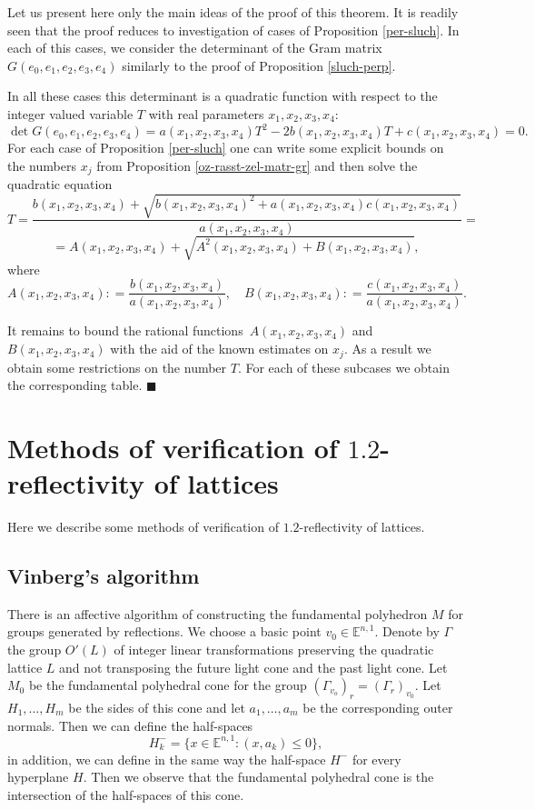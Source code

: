 \documentclass[14pt]{article}
\newenvironment{proof}                    
       {\par\indent{\bf Proof. }} 
	        {\hfill $\scriptstyle\blacksquare$}
\begin{document}
\begin{proof}
Let us present here only the main ideas of the proof  of this theorem.
It is readily seen that the proof reduces to investigation of cases of
Proposition \ref{per-sluch}. In each of this cases, we consider the determinant of the
Gram  matrix $G(e_0, e_1, e_2, e_3, e_4)$ similarly to the proof of
Proposition \ref{sluch-perp}.

In all these cases this determinant is a quadratic function with respect to the
integer valued variable $T$ with real parameters $x_1, x_2, x_3, x_4$:
$$
\det G(e_0, e_1, e_2, e_3, e_4)
= a(x_1, x_2, x_3, x_4) T^2 - 2b(x_1, x_2, x_3, x_4) T +
c(x_1, x_2, x_3, x_4)
= 0.
$$
For each case of Proposition \ref{per-sluch}
one can write some explicit bounds on the numbers
$x_j$ from Proposition \ref{oz-rasst-zel-matr-gr}
and then solve the quadratic equation
$$
T = \dfrac{b(x_1, x_2, x_3, x_4) + \sqrt{b(x_1, x_2, x_3, x_4)^2
+ a(x_1, x_2, x_3, x_4)c(x_1, x_2, x_3,
x_4)}}{a(x_1, x_2, x_3, x_4)} =
$$
$$
= A(x_1, x_2, x_3, x_4)
+ \sqrt{A^2(x_1, x_2, x_3, x_4) + B(x_1, x_2, x_3, x_4)},
$$
where
$$
A(x_1, x_2, x_3, x_4):
= \dfrac{b(x_1, x_2, x_3, x_4)}{a(x_1, x_2, x_3, x_4)}, \quad
B(x_1, x_2, x_3, x_4):
= \dfrac{c(x_1, x_2, x_3, x_4)}{a(x_1, x_2, x_3, x_4)}.
$$

It remains to bound the rational functions~$A(x_1, x_2, x_3, x_4)$ and~$B(x_1,
x_2, x_3, x_4)$ with the aid of the known estimates on $x_j$.
As a result we obtain some restrictions on the number $T$. For each of these
 subcases  we obtain the corresponding table.
\end{proof}

\section{Methods of verification of $1.2$-reflectivity of lattices}
\label{metod-issled-refl}

Here we describe some methods of verification
 of $1.2$-reflectivity of lattices.

\subsection{Vinberg's algorithm}

There is an affective algorithm of constructing
the fundamental polyhedron $M$
for groups generated by reflections.
We choose a basic point $v_0 \in \mathbb{E}^{n,1}$.
Denote by $\Gamma$ the group $O'(L)$
of integer linear transformations preserving the quadratic lattice $L$ and
not transposing
the future light cone and the past light cone.
Let $M_0$ be the fundamental polyhedral cone
for the group $(\Gamma_{v_o})_r = (\Gamma_r)_{v_0}$. Let
$H_1, \ldots , H_m$ be the sides of this cone and let $a_1, \ldots , a_m$ be the
corresponding outer normals. Then we can define the half-spaces
$$
H_k^- = \{x \in \mathbb{E}^{n,1}\colon (x, a_k) \le 0 \},
$$
in addition, we can define in the same way the half-space $H^-$
for every hyperplane $H$. Then we observe that the fundamental polyhedral cone
is the intersection of the half-spaces of this cone.
\end{document}

